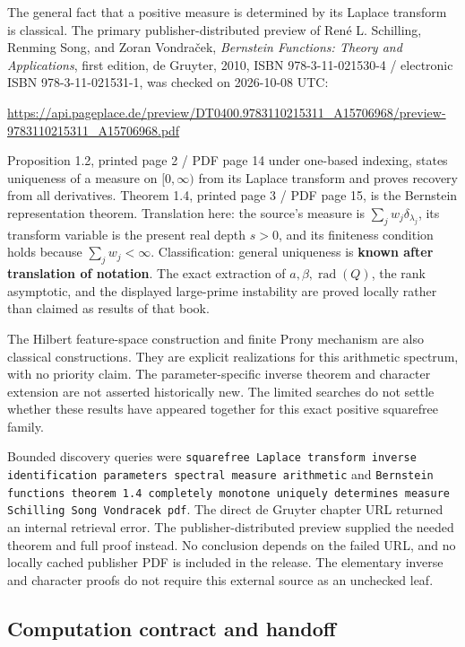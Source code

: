 The general fact that a positive measure is determined by its Laplace
transform is classical. The primary publisher-distributed preview of
René L. Schilling, Renming Song, and Zoran Vondraček, \emph{Bernstein
Functions: Theory and Applications}, first edition, de Gruyter, 2010,
ISBN 978-3-11-021530-4 / electronic ISBN 978-3-11-021531-1, was checked
on 2026-10-08 UTC:

\url{https://api.pageplace.de/preview/DT0400.9783110215311_A15706968/preview-9783110215311_A15706968.pdf}

Proposition 1.2, printed page 2 / PDF page 14 under one-based indexing,
states uniqueness of a measure on \([0,\infty)\) from its Laplace
transform and proves recovery from all derivatives. Theorem 1.4, printed
page 3 / PDF page 15, is the Bernstein representation theorem.
Translation here: the source's measure is
\(\sum_jw_j\delta_{\lambda_j}\), its transform variable is the present
real depth \(s>0\), and its finiteness condition holds because
\(\sum_jw_j<\infty\). Classification: general uniqueness is
\textbf{known after translation of notation}. The exact extraction of
\(a,\beta,\operatorname{rad}(Q)\), the rank asymptotic, and the
displayed large-prime instability are proved locally rather than claimed
as results of that book.

The Hilbert feature-space construction and finite Prony mechanism are
also classical constructions. They are explicit realizations for this
arithmetic spectrum, with no priority claim. The parameter-specific
inverse theorem and character extension are not asserted historically
new. The limited searches do not settle whether these results have
appeared together for this exact positive squarefree family.

Bounded discovery queries were
\texttt{\small squarefree Laplace transform inverse identification parameters spectral measure arithmetic}
and
\texttt{\small Bernstein functions theorem 1.4 completely monotone uniquely determines measure Schilling Song Vondracek pdf}.
The direct de Gruyter chapter URL returned an internal retrieval error.
The publisher-distributed preview supplied the needed theorem and full
proof instead. No conclusion depends on the failed URL, and no locally
cached publisher PDF is included in the release. The elementary inverse
and character proofs do not require this external source as an unchecked
leaf.

\hypertarget{computation-contract-and-handoff}{%
\subsection{Computation contract and
handoff}\label{computation-contract-and-handoff}}

